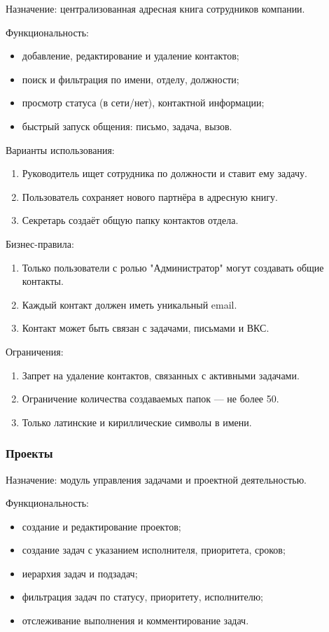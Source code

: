 Назначение: централизованная адресная книга сотрудников компании.

Функциональность:
\begin{itemize}
  \item добавление, редактирование и удаление контактов;
  \item поиск и фильтрация по имени, отделу, должности;
  \item просмотр статуса (в сети/нет), контактной информации;
  \item быстрый запуск общения: письмо, задача, вызов.
\end{itemize}

Варианты использования:
\begin{enumerate}
  \item Руководитель ищет сотрудника по должности и ставит ему задачу.
  \item Пользователь сохраняет нового партнёра в адресную книгу.
  \item Секретарь создаёт общую папку контактов отдела.
\end{enumerate}

Бизнес-правила:
\begin{enumerate}
  \item Только пользователи с ролью "Администратор" могут создавать общие контакты.
  \item Каждый контакт должен иметь уникальный email.
  \item Контакт может быть связан с задачами, письмами и ВКС.
\end{enumerate}

Ограничения:
\begin{enumerate}
  \item Запрет на удаление контактов, связанных с активными задачами.
  \item Ограничение количества создаваемых папок — не более 50.
  \item Только латинские и кириллические символы в имени.
\end{enumerate}

\subsubsection{Проекты}

Назначение: модуль управления задачами и проектной деятельностью.

Функциональность:
\begin{itemize}
  \item создание и редактирование проектов;
  \item создание задач с указанием исполнителя, приоритета, сроков;
  \item иерархия задач и подзадач;
  \item фильтрация задач по статусу, приоритету, исполнителю;
  \item отслеживание выполнения и комментирование задач.
\end{itemize}

